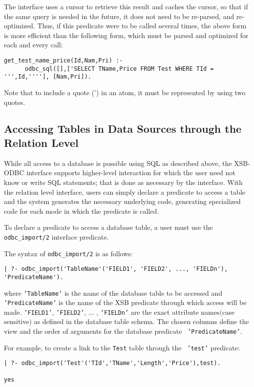 The interface uses a cursor to retrieve this result and caches the
cursor, so that if the same query is needed in the future, it does not
need to be re-parsed, and re-optimized.  Thus, if this predicate were
to be called several times, the above form is more efficient than the
following form, which must be parsed and optimized for each and every
call:

\begin{verbatim}
get_test_name_price(Id,Nam,Pri) :-
      odbc_sql([],['SELECT TName,Price FROM Test WHERE TId = ''',Id,''''], [Nam,Pri]).
\end{verbatim}

Note that to include a quote (') in an atom, it must be represented
by using two quotes.

\subsection{Accessing Tables in Data Sources through the Relation Level}

While all access to a database is possible using SQL as described
above, the XSB-ODBC interface supports higher-level interaction for
which the user need not know or write SQL statements; that is done as
necessary by the interface.  With the relation level interface, users
can simply declare a predicate to access a table and the system
generates the necessary underlying code, generating specialized code
for each mode in which the predicate is called.

To declare a predicate to access a database table, a user must use the
{\tt odbc\_import/2} interface predicate.

The syntax of  {\tt odbc\_import/2} is as follows:

\begin{verbatim}
| ?- odbc_import('TableName'('FIELD1', 'FIELD2', ..., 'FIELDn'), 'PredicateName').
\end{verbatim}
\noindent
where {\tt 'TableName'} is the name of the database table to be
accessed and {\tt 'PredicateName'} is the name of the XSB predicate
through which access will be made. {\tt 'FIELD1'}, {\tt 'FIELD2'},
... , {\tt 'FIELDn'} are the exact attribute names$($case sensitive$)$
as defined in the database table schema.  The chosen columns define
the view and the order of arguments for the database predicate {\tt
'PredicateName'}.
 
For example, to create a link to the {\tt Test} table through the {\tt
'test'} predicate:
\begin{verbatim}
| ?- odbc_import('Test'('TId','TName','Length','Price'),test).

yes
\end{verbatim}

